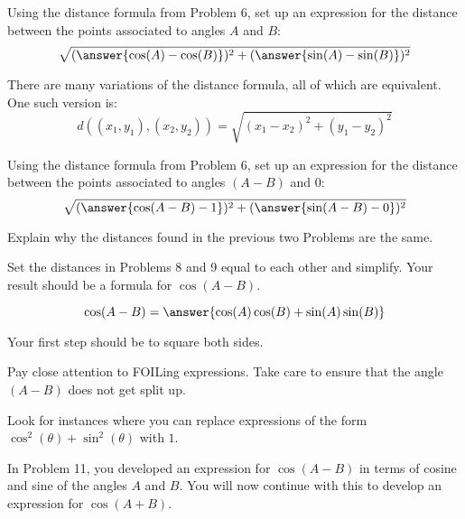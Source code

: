 \documentclass[number]{ximera}
\begin{document}
\begin{problem}
Using the distance formula from Problem 6, set up an expression for the distance between the points associated to angles $A$ and $B$:
\[\sqrt{(\answer{\cos(A)-\cos(B)})^2+(\answer{\sin(A)-\sin(B)})^2}\]
\begin{hint}
There are many variations of the distance formula, all of which are equivalent. One such version is:
\[d((x_1,y_1),(x_2,y_2))=\sqrt{(x_1-x_2)^2+(y_1-y_2)^2}\]
\end{hint}
\end{problem}

\begin{problem}
Using the distance formula from Problem 6, set up an expression for the distance between the points associated to angles $(A-B)$ and $0$:
\[\sqrt{(\answer{\cos(A-B)-1})^2+(\answer{\sin(A-B)-0})^2}\]

\end{problem}

\begin{question}
Explain why the distances found in the previous two Problems are the same.
\begin{freeResponse}
\end{freeResponse}
\end{question}

\begin{problem}
Set the distances in Problems 8 and 9 equal to each other and simplify.
Your result should be a formula for $\cos(A-B)$.

\[\cos(A-B)=\answer{\cos(A)\cos(B)+\sin(A)\sin(B)}\]

\begin{hint}
Your first step should be to square both sides.
\end{hint}
\begin{hint}
Pay close attention to FOILing expressions. Take care to ensure that the angle $(A-B)$ does not get split up.
\end{hint}
\begin{hint}
Look for instances where you can replace expressions of the form $\cos^2(\theta)+\sin^2(\theta)$ with $1$.
\end{hint}
\end{problem}

In Problem 11, you developed an expression for $\cos(A-B)$ in terms of cosine and sine of the angles $A$ and $B$. You will now continue with this to develop an expression for $\cos(A+B)$.

\end{document}
